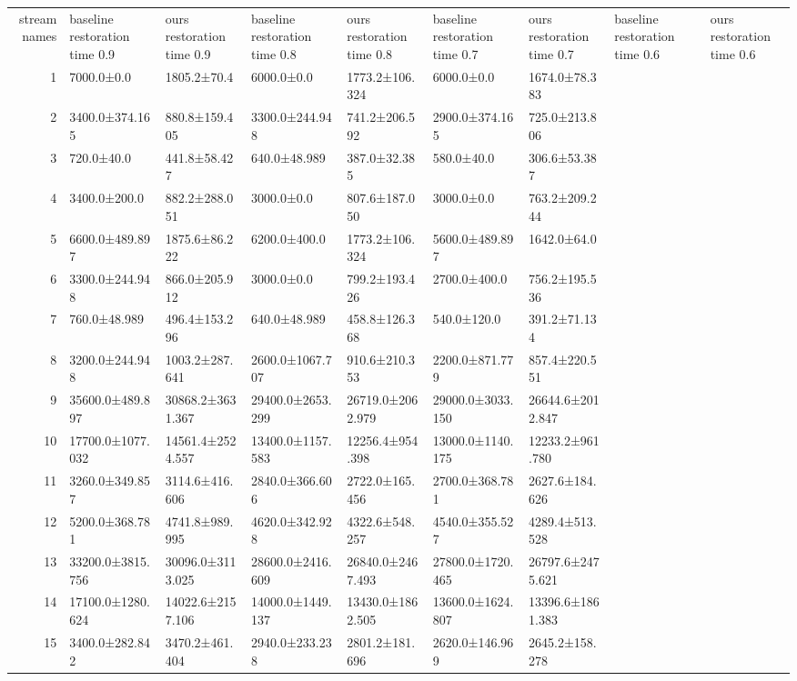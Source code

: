 \begin{tabular}{|r|l|l|l|l|l|l|l|l|}
  \hline
  stream names & baseline restoration time 0.9 & ours restoration time 0.9 & baseline restoration time 0.8 & ours restoration time 0.8 & baseline restoration time 0.7 & ours restoration time 0.7 & baseline restoration time 0.6 & ours restoration time 0.6 \\ 
  1 & 7000.0±0.0 & 1805.2±70.4 & 6000.0±0.0 & 1773.2±106.324 & 6000.0±0.0 & 1674.0±78.383 \\ 
  2 & 3400.0±374.165 & 880.8±159.405 & 3300.0±244.948 & 741.2±206.592 & 2900.0±374.165 & 725.0±213.806 \\ 
  3 & 720.0±40.0 & 441.8±58.427 & 640.0±48.989 & 387.0±32.385 & 580.0±40.0 & 306.6±53.387 \\ 
  4 & 3400.0±200.0 & 882.2±288.051 & 3000.0±0.0 & 807.6±187.050 & 3000.0±0.0 & 763.2±209.244 \\ 
  5 & 6600.0±489.897 & 1875.6±86.222 & 6200.0±400.0 & 1773.2±106.324 & 5600.0±489.897 & 1642.0±64.0 \\ 
  6 & 3300.0±244.948 & 866.0±205.912 & 3000.0±0.0 & 799.2±193.426 & 2700.0±400.0 & 756.2±195.536 \\ 
  7 & 760.0±48.989 & 496.4±153.296 & 640.0±48.989 & 458.8±126.368 & 540.0±120.0 & 391.2±71.134 \\ 
  8 & 3200.0±244.948 & 1003.2±287.641 & 2600.0±1067.707 & 910.6±210.353 & 2200.0±871.779 & 857.4±220.551 \\ 
  9 & 35600.0±489.897 & 30868.2±3631.367 & 29400.0±2653.299 & 26719.0±2062.979 & 29000.0±3033.150 & 26644.6±2012.847 \\ 
  10 & 17700.0±1077.032 & 14561.4±2524.557 & 13400.0±1157.583 & 12256.4±954.398 & 13000.0±1140.175 & 12233.2±961.780 \\ 
  11 & 3260.0±349.857 & 3114.6±416.606 & 2840.0±366.606 & 2722.0±165.456 & 2700.0±368.781 & 2627.6±184.626 \\ 
  12 & 5200.0±368.781 & 4741.8±989.995 & 4620.0±342.928 & 4322.6±548.257 & 4540.0±355.527 & 4289.4±513.528 \\ 
  13 & 33200.0±3815.756 & 30096.0±3113.025 & 28600.0±2416.609 & 26840.0±2467.493 & 27800.0±1720.465 & 26797.6±2475.621 \\ 
  14 & 17100.0±1280.624 & 14022.6±2157.106 & 14000.0±1449.137 & 13430.0±1862.505 & 13600.0±1624.807 & 13396.6±1861.383 \\ 
  15 & 3400.0±282.842 & 3470.2±461.404 & 2940.0±233.238 & 2801.2±181.696 & 2620.0±146.969 & 2645.2±158.278 \\ 

\end{tabular}
